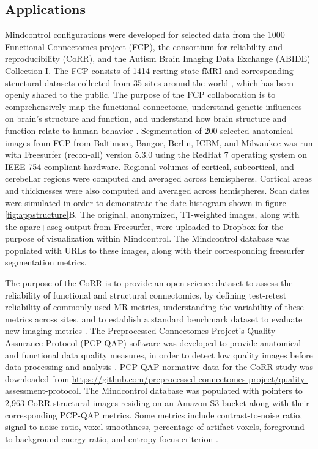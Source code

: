 \subsection{Applications}

Mindcontrol configurations were developed for selected data from the 1000 Functional Connectomes project (FCP), the consortium for reliability and reproducibility (CoRR), and the Autism Brain Imaging Data Exchange (ABIDE) Collection I. The FCP consists of 1414 resting state fMRI and corresponding structural datasets collected from 35 sites around the world  \cite{biswal2010toward}, which has been openly shared to the public. The purpose of the FCP collaboration is to comprehensively map the functional connectome, understand genetic influences on brain's structure and function, and understand how brain structure and function relate to human behavior \cite{biswal2010toward}. Segmentation of 200 selected anatomical images from FCP from Baltimore, Bangor, Berlin, ICBM, and Milwaukee was run with Freesurfer (recon-all) version 5.3.0 \cite{fischl2002whole} using the RedHat 7 operating system on IEEE 754 compliant hardware. Regional volumes of cortical, subcortical, and cerebellar regions were computed and averaged across hemispheres. Cortical areas and thicknesses were also computed and averaged across hemispheres. Scan dates were simulated in order to demonstrate the date histogram shown in figure \ref{fig:appstructure}B. The original, anonymized, T1-weighted images, along with the aparc+aseg output from Freesurfer, were uploaded to Dropbox for the purpose of visualization within Mindcontrol. The Mindcontrol database was populated with URLs to these images, along with their corresponding freesurfer segmentation metrics.

The purpose of the CoRR is to provide an open-science dataset to assess the reliability of functional and structural connectomics, by defining test-retest reliability of commonly used MR metrics, understanding the variability of these metrics across sites, and to establish a standard benchmark dataset to evaluate new imaging metrics \cite{Zuo_2014}. The Preprocessed-Connectomes Project's Quality Assurance Protocol (PCP-QAP) software was developed to provide anatomical and functional data quality measures, in order to detect low quality images before data processing and analysis \cite{shehzadpreprocessed}. PCP-QAP normative data for the CoRR study was downloaded from \href{http://raw.githubusercontent.com/preprocessed-connectomes-project/quality-assessment-protocol/master/poster_data/corr_anat.csv}{https://github.com/preprocessed-connectomes-project/quality-assessment-protocol}. The Mindcontrol database was populated with pointers to 2,963 CoRR structural images residing on an Amazon S3 bucket along with their corresponding PCP-QAP metrics. Some metrics include contrast-to-noise ratio, signal-to-noise ratio, voxel smoothness, percentage of artifact voxels, foreground-to-background energy ratio, and entropy focus criterion \cite{shehzadpreprocessed}. 

